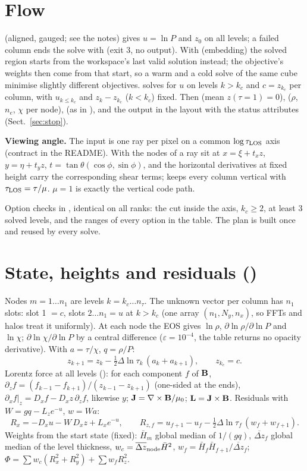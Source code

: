 \section{Flow}
 (aligned, gauged; see the  notes) gives $u=\ln P$ and $z_0$ on all levels; a failed
column ends the solve with  (exit 3, no output). With  (embedding) the solved
region starts from the workspace's last valid solution instead; the objective's weights then come from that start, so a warm and
a cold solve of the same cube minimise slightly different objectives.  solves for $u$ on levels $k>k_c$ and
$c=z_{k_c}$ per column, with $u_{k\le k_c}$ and $z_k-z_{k_c}$ ($k<k_c$) fixed. Then  (mean $z(\tau{=}1)=0$),
 ($\rho$, $n_e$, $\chi$ per node),  (as in ), and the output in the
 layout with the status attributes (Sect.~\ref{sec:stop}).

\textbf{Viewing angle.} The input is one ray per pixel on a common $\log\tau_{\rm LOS}$ axis (contract in the README). With
 the nodes of a ray sit at $x=\xi+t_xz$, $y=\eta+t_yz$, $t=\tan\theta(\cos\phi,\sin\phi)$, and the
horizontal derivatives at fixed height carry the corresponding shear terms;  keeps every column vertical
with $\tau_{\rm LOS}=\tau/\mu$. $\mu=1$ is exactly the vertical code path.

Option checks in , identical on all ranks: the cut inside the axis, $k_c\ge2$, at least 3 solved
levels, and the ranges of every option in the table. The  plan is built once and reused by every solve.

\section{State, heights and residuals ()}
Nodes $m=1\ldots n_1$ are levels $k=k_c\ldots n_\tau$. The unknown vector per column has $n_1$ slots: slot 1 $=c$, slots
$2\ldots n_1=u$ at $k>k_c$ (one array $(n_1,N_y,n_x)$, so FFTs and halos treat it uniformly). At each node the EOS gives
$\ln\rho$, $\partial\ln\rho/\partial\ln P$ and $\ln\chi$; $\partial\ln\chi/\partial\ln P$ by a central difference
($\varepsilon=10^{-4}$, the table returns no opacity derivative). With $a=\tau/\chi$, $q=\rho/P$:
\[
z_{k+1}=z_k-\tfrac12\Delta\ln\tau_k\,(a_k+a_{k+1}),\qquad z_{k_c}=c .
\]
Lorentz force at all levels (): for each component $f$ of $\mathbf B$,
$\partial_zf=(f_{k-1}-f_{k+1})/(z_{k-1}-z_{k+1})$ (one-sided at the ends), $\partial_xf|_z=D_xf-D_xz\,\partial_zf$, likewise
$y$; $\mathbf J=\nabla\times\mathbf B/\mu_0$; $\mathbf L=\mathbf J\times\mathbf B$. Residuals with $W=gq-L_ze^{-u}$, $w=Wa$:
\[
R_x=-D_xu-W\,D_xz+L_xe^{-u},\qquad R_{z,f}=u_{f+1}-u_f-\tfrac12\Delta\ln\tau_f\,(w_f+w_{f+1}) .
\]
Weights from the start state (fixed): $\bar H_m$ global median of $1/(gq)$, $\overline{\Delta z}_f$ global median of the level
thickness, $w_c=\overline{\Delta z}_{\rm node}\bar H^2$, $w_f=\bar H_f\bar H_{f+1}/\overline{\Delta z}_f$;
$\Phi=\sum w_c(R_x^2+R_y^2)+\sum w_fR_z^2$.

